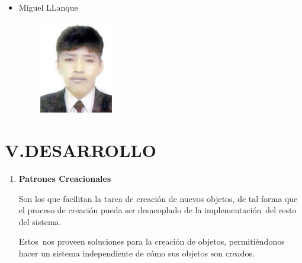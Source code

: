 \documentclass[12pt]{article}
\begin{document}
\begin{multicols}{2}
\begin{itemize}

\par

	\item {\fontsize{9pt}{10.8pt}\selectfont Miguel LLanque\par}
\end{itemize}\par




\begin{figure}[H]		\includegraphics[width=1.68in,height=1.6in]{./media/image5.jpeg}
\end{figure}



\par


\vspace{\baselineskip}\section*{ V.DESARROLLO}
\begin{enumerate}
	\item \textbf{Patrones Creacionales}\par

{\fontsize{9pt}{10.8pt}\selectfont Son los que facilitan la tarea de creación de nuevos objetos, de tal forma que el proceso de creación pueda ser desacoplado de la implementación\ del resto del sistema.  \par}\par


\vspace{\baselineskip}
{\fontsize{9pt}{10.8pt}\selectfont Estos\ nos proveen soluciones para la creación de objetos, permitiéndonos hacer un sistema independiente de cómo sus objetos son creados.  \par}\par



\end{enumerate}
\end{multicols}
\end{document}
